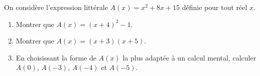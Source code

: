 \begin{exo}
	On considère l'expression littérale $A(x) = x^2 + 8x + 15$ définie pour tout réel $x$.
	\begin{enumerate}
		\item Montrer que $A(x) = (x + 4)^2 - 1$.
		\item Montrer que $A(x) = (x + 3)(x + 5)$.
		\item En choisissant la forme de $A(x)$ la plus adaptée à un calcul mental, calculer $A(0)$, $A(-3)$, $A(-4)$ et $A(-5)$.
	\end{enumerate}
\end{exo}
